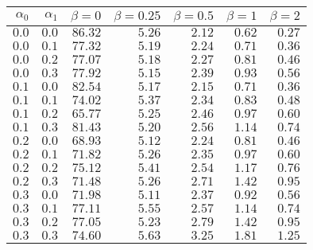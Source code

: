\begin{tabular}{rr|rrrrr}
\hline\hline
 $\alpha_0$ & $\alpha_1$ & $\beta=0$ & $\beta=0.25$ & $\beta=0.5$ & $\beta=1$ & $\beta=2$ \\ 
 \hline
$0.0$ & $0.0$ & $86.32$ & $5.26$ & $2.12$ & $0.62$ & $0.27$\\ 
$0.0$ & $0.1$ & $77.32$ & $5.19$ & $2.24$ & $0.71$ & $0.36$\\ 
$0.0$ & $0.2$ & $77.07$ & $5.18$ & $2.27$ & $0.81$ & $0.46$\\ 
$0.0$ & $0.3$ & $77.92$ & $5.15$ & $2.39$ & $0.93$ & $0.56$\\ 
$0.1$ & $0.0$ & $82.54$ & $5.17$ & $2.15$ & $0.71$ & $0.36$\\ 
$0.1$ & $0.1$ & $74.02$ & $5.37$ & $2.34$ & $0.83$ & $0.48$\\ 
$0.1$ & $0.2$ & $65.77$ & $5.25$ & $2.46$ & $0.97$ & $0.60$\\ 
$0.1$ & $0.3$ & $81.43$ & $5.20$ & $2.56$ & $1.14$ & $0.74$\\ 
$0.2$ & $0.0$ & $68.93$ & $5.12$ & $2.24$ & $0.81$ & $0.46$\\ 
$0.2$ & $0.1$ & $71.82$ & $5.26$ & $2.35$ & $0.97$ & $0.60$\\ 
$0.2$ & $0.2$ & $75.12$ & $5.41$ & $2.54$ & $1.17$ & $0.76$\\ 
$0.2$ & $0.3$ & $71.48$ & $5.26$ & $2.71$ & $1.42$ & $0.95$\\ 
$0.3$ & $0.0$ & $71.98$ & $5.11$ & $2.37$ & $0.92$ & $0.56$\\ 
$0.3$ & $0.1$ & $77.11$ & $5.55$ & $2.57$ & $1.14$ & $0.74$\\ 
$0.3$ & $0.2$ & $77.05$ & $5.23$ & $2.79$ & $1.42$ & $0.95$\\ 
$0.3$ & $0.3$ & $74.60$ & $5.63$ & $3.25$ & $1.81$ & $1.25$\\ 
 \hline 
 \end{tabular}